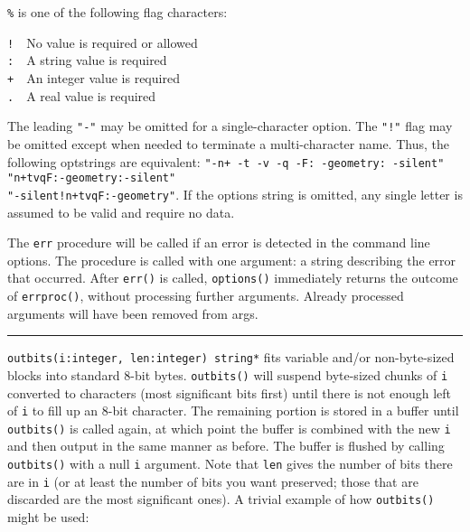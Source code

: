 \texttt{\%} is one of the following flag characters:

\texttt{!}\ \ No value is required or allowed\\
\texttt{:}\ \ A string value is required\\
\texttt{+}\ \ An integer value is required\\
\texttt{.}\ \ A real value is required

The leading \texttt{"-"} may be omitted for
a single-character option. The \texttt{"!"}
flag may be omitted except when needed to terminate a multi-character
name. Thus, the following optstrings are equivalent:
\texttt{"-n+ -t -v -q -F: -geometry:
-silent"}
\texttt{"n+tvqF:-geometry:-silent"}\\
\texttt{"-silent!n+tvqF:-geometry"}. If the
options string is omitted, any single letter is assumed to be valid and
require no data.

The \texttt{err} procedure will be called if an error is detected in the
command line options. The procedure is called with one argument: a
string describing the error that occurred. After \texttt{err()} is
called, \texttt{options()} immediately returns the outcome of
\texttt{errproc()}, without processing further arguments. Already
processed arguments will have been removed from args.

\vspace{0.25cm}\hrule{}

\texttt{outbits(i:integer, len:integer) string*} fits variable and/or
non-byte-sized blocks into standard 8-bit bytes. \texttt{outbits()}
will suspend byte-sized chunks of \texttt{i} converted to characters
(most significant bits first) until there is not enough left of
\texttt{i} to fill up an 8-bit character. The remaining portion is
stored in a buffer until \texttt{outbits()} is called again, at which
point the buffer is combined with the new \texttt{i} and then output in
the same manner as before. The buffer is flushed by calling
\texttt{outbits()} with a null \texttt{i} argument. Note that
\texttt{len} gives the number of bits there are in \texttt{i} (or at
least the number of bits you want preserved; those that are discarded
are the most significant ones). A trivial example of how
\texttt{outbits()} might be used:


